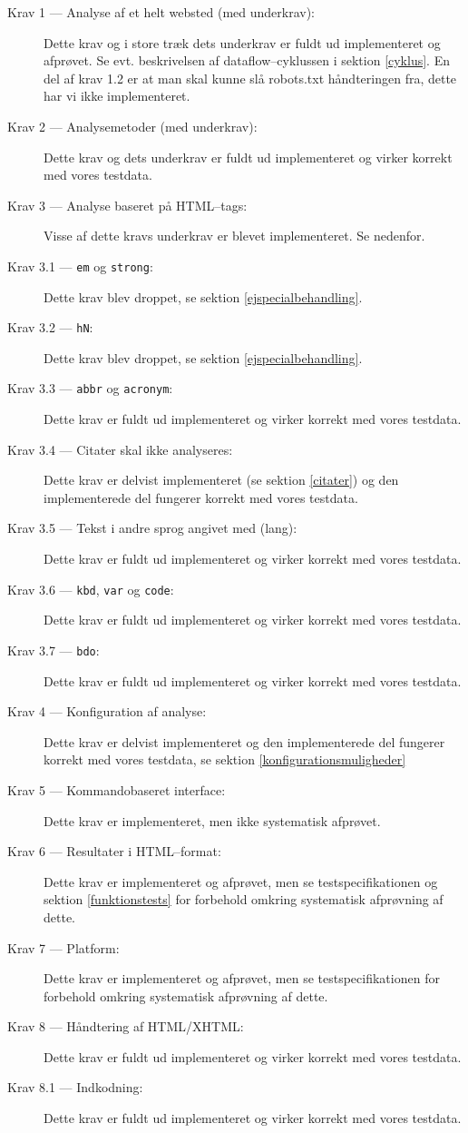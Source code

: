 \documentclass[a4paper,oneside]{memoir}
\begin{document}
\begin{description} \item[Krav 1 --- Analyse af et helt websted (med
  underkrav):] Dette krav og i store træk dets underkrav er fuldt ud
  implementeret og afprøvet. Se evt. beskrivelsen af
  dataflow--cyklussen i sektion \ref{cyklus}.
  En del af krav 1.2 er at man skal kunne slå robots.txt håndteringen
  fra, dette har vi ikke implementeret.
\item[Krav 2 --- Analysemetoder (med underkrav):] Dette krav og dets
  underkrav er fuldt ud implementeret og virker korrekt
  med vores testdata.
\item[Krav 3 --- Analyse baseret på HTML--tags:] Visse af dette kravs
  underkrav er blevet implementeret. Se nedenfor.
\item[Krav 3.1 --- \texttt{em} og \texttt{strong}:] Dette krav blev
  droppet, se sektion \ref{ejspecialbehandling}.
\item[Krav 3.2 --- \texttt{hN}:] Dette krav blev droppet, se sektion
  \ref{ejspecialbehandling}.
\item[Krav 3.3 --- \texttt{abbr} og \texttt{acronym}:] Dette krav er
  fuldt ud implementeret og virker korrekt med vores testdata.
\item[Krav 3.4 --- Citater skal ikke analyseres:] Dette krav er
  delvist implementeret (se sektion \ref{citater}) og den
  implementerede del fungerer korrekt med vores testdata.
\item[Krav 3.5 --- Tekst i andre sprog angivet med (lang):] Dette krav er
  fuldt ud implementeret og virker korrekt med vores testdata.
\item[Krav 3.6 --- \texttt{kbd}, \texttt{var} og \texttt{code}:] Dette
  krav er fuldt ud implementeret og virker korrekt med vores testdata.
\item[Krav 3.7 --- \texttt{bdo}:] Dette
  krav er fuldt ud implementeret og virker korrekt med vores testdata.
\item[Krav 4 --- Konfiguration af analyse:] Dette krav er delvist
  implementeret og den implementerede del fungerer korrekt med vores
  testdata, se sektion \ref{konfigurationsmuligheder}
\item[Krav 5 --- Kommandobaseret interface:] Dette krav er
  implementeret, men ikke systematisk afprøvet.
\item[Krav 6 --- Resultater i HTML--format:] Dette krav er
  implementeret og afprøvet, men se testspecifikationen og sektion
  \ref{funktionstests} for forbehold omkring systematisk afprøvning af
  dette.
\item[Krav 7 --- Platform:] Dette krav er implementeret og afprøvet,
  men se testspecifikationen for forbehold omkring systematisk
  afprøvning af dette.
\item[Krav 8 --- Håndtering af HTML/XHTML:] Dette krav er fuldt ud
  implementeret og virker korrekt med vores testdata.
\item[Krav 8.1 --- Indkodning:] Dette krav er fuldt ud implementeret
  og virker korrekt med vores testdata.
\end{description}
\end{document}
